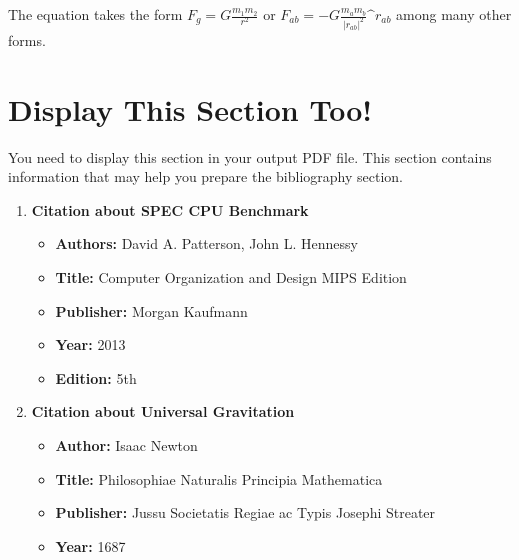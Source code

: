 \documentclass[11pt]{article}
\begin{document}
The equation takes the form $F_g = G\frac{m_1m_2}{r^2}$ or $F_{ab} = -G\frac{m_am_b}{{|r_{ab}|}^2}\^r_{ab}$ among many other
forms.

\section*{Display This Section Too!}
You need to display this section in your output PDF file. This section contains information
that may help you prepare the bibliography section.

\begin{enumerate}
    \item \textbf{Citation about SPEC CPU Benchmark}
    \begin{itemize}
        \item \textbf{Authors:} David A. Patterson, John L. Hennessy
        \item \textbf{Title:} Computer Organization and Design MIPS Edition
        \item \textbf{Publisher:}  Morgan Kaufmann
        \item \textbf{Year:} 2013
        \item \textbf{Edition:} 5th
    \end{itemize}
    \item \textbf{Citation about Universal Gravitation}
    \begin{itemize}
        \item \textbf{Author:} Isaac Newton
        \item \textbf{Title:} Philosophiae Naturalis Principia Mathematica
        \item \textbf{Publisher:} Jussu Societatis Regiae ac Typis Josephi Streater
        \item \textbf{Year:} 1687
    \end{itemize}
\end{enumerate}



\end{document}
